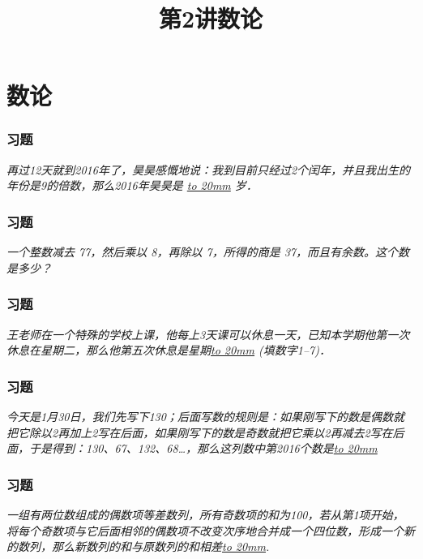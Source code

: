 \section{数论}

\title[第2讲\quad 数论]{第2讲\quad 数论} 
\author{}
\date{}

\begin{frame}
    \titlepage
\end{frame}

\setcounter{framecounter}{0}

\begin{frame}
    \frametitle{习题\theframecounter}
    \center\textit{再过12天就到2016年了，昊昊感慨地说：我到目前只经过2个闰年，并且我出生的年份是9的倍数，那么2016年昊昊是 \underline{\hbox to 20mm{}} 岁．} %
\end{frame}

\begin{frame}
    \frametitle{习题\theframecounter}
    \textit{一个整数减去 77，然后乘以 8，再除以 7，所得的商是 37，而且有余数。这个数是多少？} %
\end{frame}

\begin{frame}
    \frametitle{习题\theframecounter}
    \textit{王老师在一个特殊的学校上课，他每上3天课可以休息一天，已知本学期他第一次休息在星期二，那么他第五次休息是星期\underline{\hbox to 20mm{}} (填数字1--7)．} %
\end{frame}

\begin{frame}
    \frametitle{习题\theframecounter}
    
    \textit{今天是1月30日，我们先写下130；后面写数的规则是：如果刚写下的数是偶数就把它除以2再加上2写在后面，如果刚写下的数是奇数就把它乘以2再减去2写在后面，于是得到：130、67、132、68…，那么这列数中第2016个数是\underline{\hbox to 20mm{}}} %
\end{frame}

\begin{frame}
    \frametitle{习题\theframecounter}
    
    \textit{一组有两位数组成的偶数项等差数列，所有奇数项的和为100，若从第1项开始，将每个奇数项与它后面相邻的偶数项不改变次序地合并成一个四位数，形成一个新的数列，那么新数列的和与原数列的和相差\underline{\hbox to 20mm{}}.} %
\end{frame}

